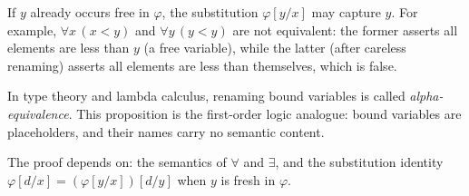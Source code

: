 \begin{remark*}
If $y$ already occurs free in $\varphi$, the substitution $\varphi[y/x]$ may
capture $y$. For example, $\forall x\,(x < y)$ and $\forall y\,(y < y)$ are
not equivalent: the former asserts all elements are less than $y$ (a free
variable), while the latter (after careless renaming) asserts all elements are
less than themselves, which is false.
\end{remark*}

\begin{remark*}
In type theory and lambda calculus, renaming bound variables is called
\emph{alpha-equivalence}. This proposition is the first-order logic analogue:
bound variables are placeholders, and their names carry no semantic content.
\end{remark*}

\begin{remark*}[Dependencies]
The proof depends on: the semantics of $\forall$ and $\exists$, and the
substitution identity $\varphi[d/x] = (\varphi[y/x])[d/y]$ when $y$ is fresh
in $\varphi$.
\end{remark*}
